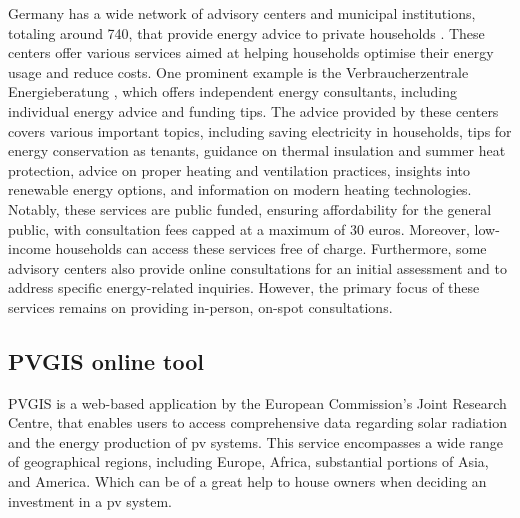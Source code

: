 Germany has a wide network of advisory centers and municipal institutions, totaling around 740, that provide energy advice to private households \cite{bmwk2023}. 
These centers offer various services aimed at helping households optimise their energy usage and reduce costs. 
One prominent example is the Verbraucherzentrale Energieberatung \cite{VB2023}, 
which offers independent energy consultants, including individual energy advice and funding tips. 
The advice provided by these centers covers various important topics, including saving electricity in households, tips for energy conservation as tenants, guidance on thermal insulation and summer heat protection, advice on proper heating and ventilation practices, insights into renewable energy options, and information on modern heating technologies.
Notably, these services are public funded, ensuring affordability for the general public, with consultation fees capped at a maximum of 30 euros. 
Moreover, low-income households can access these services free of charge.
Furthermore, some advisory centers also provide online consultations for an initial assessment and to address specific energy-related inquiries. 
However, the primary focus of these services remains on providing in-person, on-spot consultations. 

\subsection{PVGIS online tool}
PVGIS \cite{pvgis} is a web-based application by the European Commission's Joint Research Centre, 
that enables users to access comprehensive data regarding solar radiation and the energy production of \gls{pv} systems. 
This service encompasses a wide range of geographical regions, including Europe, Africa, substantial portions of Asia, and America.
Which can be of a great help to house owners when deciding an investment in a \gls{pv} system. 

